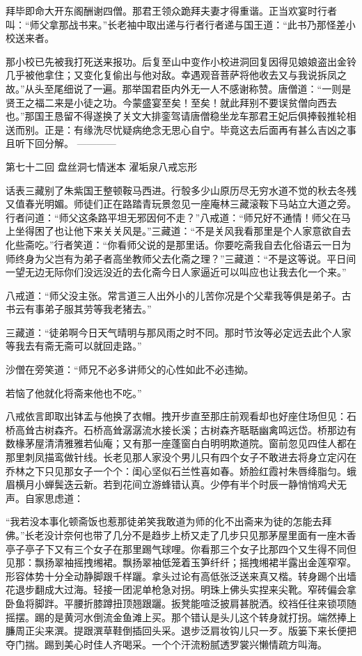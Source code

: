 \documentclass[12pt,UTF8]{ctexbook}
\begin{document}
拜毕即命大开东阁酬谢四僧。那君王领众跪拜夫妻才得重谐。正当欢宴时行者叫：“师父拿那战书来。”长老袖中取出递与行者行者递与国王道：“此书乃那怪差小校送来者。

那小校已先被我打死送来报功。后复至山中变作小校进洞回复因得见娘娘盗出金铃几乎被他拿住；又变化复偷出与他对敌。幸遇观音菩萨将他收去又与我说拆凤之故。”从头至尾细说了一遍。那举国君臣内外无一人不感谢称赞。唐僧道：“一则是贤王之福二来是小徒之功。今蒙盛宴至矣！至矣！就此拜别不要误贫僧向西去也。”那国王恳留不得遂换了关文大排銮驾请唐僧稳坐龙车那君王妃后俱捧毂推轮相送而别。正是：有缘洗尽忧疑病绝念无思心自宁。毕竟这去后面再有甚么吉凶之事且听下回分解。
------------

第七十二回 盘丝洞七情迷本 濯垢泉八戒忘形

话表三藏别了朱紫国王整顿鞍马西进。行彀多少山原历尽无穷水道不觉的秋去冬残又值春光明媚。师徒们正在路踏青玩景忽见一座庵林三藏滚鞍下马站立大道之旁。行者问道：“师父这条路平坦无邪因何不走？”八戒道：“师兄好不通情！师父在马上坐得困了也让他下来关关风是。”三藏道：“不是关风我看那里是个人家意欲自去化些斋吃。”行者笑道：“你看师父说的是那里话。你要吃斋我自去化俗语云一日为师终身为父岂有为弟子者高坐教师父去化斋之理？”三藏道：“不是这等说。平日间一望无边无际你们没远没近的去化斋今日人家逼近可以叫应也让我去化一个来。”

八戒道：“师父没主张。常言道三人出外小的儿苦你况是个父辈我等俱是弟子。古书云有事弟子服其劳等我老猪去。”

三藏道：“徒弟啊今日天气晴明与那风雨之时不同。那时节汝等必定远去此个人家等我去有斋无斋可以就回走路。”

沙僧在旁笑道：“师兄不必多讲师父的心性如此不必违拗。

若恼了他就化将斋来他也不吃。”

八戒依言即取出钵盂与他换了衣帽。拽开步直至那庄前观看却也好座住场但见：石桥高耸古树森齐。石桥高耸潺潺流水接长溪；古树森齐聒聒幽禽鸣远岱。桥那边有数椽茅屋清清雅雅若仙庵；又有那一座蓬窗白白明明欺道院。窗前忽见四佳人都在那里刺凤描鸾做针线。长老见那人家没个男儿只有四个女子不敢进去将身立定闪在乔林之下只见那女子一个个：闺心坚似石兰性喜如春。娇脸红霞衬朱唇绛脂匀。蛾眉横月小蝉鬓迭云新。若到花间立游蜂错认真。少停有半个时辰一静悄悄鸡犬无声。自家思虑道：

“我若没本事化顿斋饭也惹那徒弟笑我敢道为师的化不出斋来为徒的怎能去拜佛。”长老没计奈何也带了几分不是趋步上桥又走了几步只见那茅屋里面有一座木香亭子亭子下又有三个女子在那里踢气球哩。你看那三个女子比那四个又生得不同但见那：飘扬翠袖摇拽缃裙。飘扬翠袖低笼着玉笋纤纤；摇拽缃裙半露出金莲窄窄。形容体势十分全动静脚跟千样躧。拿头过论有高低张泛送来真又楷。转身踢个出墙花退步翻成大过海。轻接一团泥单枪急对拐。明珠上佛头实捏来尖靴。窄砖偏会拿卧鱼将脚跘。平腰折膝蹲扭顶翘跟躧。扳凳能喧泛披肩甚脱洒。绞裆任往来锁项随摇摆。踢的是黄河水倒流金鱼滩上买。那个错认是头儿这个转身就打拐。端然捧上臁周正尖来潠。提跟潠草鞋倒插回头采。退步泛肩妆钩儿只一歹。版篓下来长便把夺门揣。踢到美心时佳人齐喝采。一个个汗流粉腻透罗裳兴懒情疏方叫海。
\end{document}
